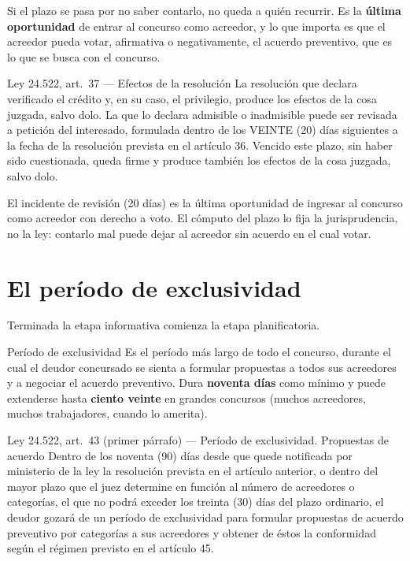 \documentclass[12pt,oneside]{book}
\begin{document}
Si el plazo se pasa por no saber contarlo, no queda a quién recurrir. Es la \textbf{última oportunidad} de entrar al concurso como acreedor, y lo que importa es que el acreedor pueda votar, afirmativa o negativamente, el acuerdo preventivo, que es lo que se busca con el concurso.

\begin{norma}{Ley 24.522, art.\ 37 --- Efectos de la resolución}
La resolución que declara verificado el crédito y, en su caso, el privilegio, produce los efectos de la cosa juzgada, salvo dolo. La que lo declara admisible o inadmisible puede ser revisada a petición del interesado, formulada dentro de los VEINTE (20) días siguientes a la fecha de la resolución prevista en el artículo 36. Vencido este plazo, sin haber sido cuestionada, queda firme y produce también los efectos de la cosa juzgada, salvo dolo.
\end{norma}

\begin{important}
El incidente de revisión (20 días) es la última oportunidad de ingresar al concurso como acreedor con derecho a voto. El cómputo del plazo lo fija la jurisprudencia, no la ley: contarlo mal puede dejar al acreedor sin acuerdo en el cual votar.
\end{important}

\section{El período de exclusividad}

Terminada la etapa informativa comienza la etapa planificatoria.

\begin{definition}{Período de exclusividad}
Es el período más largo de todo el concurso, durante el cual el deudor concursado se sienta a formular propuestas a todos sus acreedores y a negociar el acuerdo preventivo. Dura \textbf{noventa días} como mínimo y puede extenderse hasta \textbf{ciento veinte} en grandes concursos (muchos acreedores, muchos trabajadores, cuando lo amerita).
\end{definition}

\begin{norma}{Ley 24.522, art.\ 43 (primer párrafo) --- Período de exclusividad. Propuestas de acuerdo}
Dentro de los noventa (90) días desde que quede notificada por ministerio de la ley la resolución prevista en el artículo anterior, o dentro del mayor plazo que el juez determine en función al número de acreedores o categorías, el que no podrá exceder los treinta (30) días del plazo ordinario, el deudor gozará de un período de exclusividad para formular propuestas de acuerdo preventivo por categorías a sus acreedores y obtener de éstos la conformidad según el régimen previsto en el artículo 45.
\end{norma}
\end{document}
